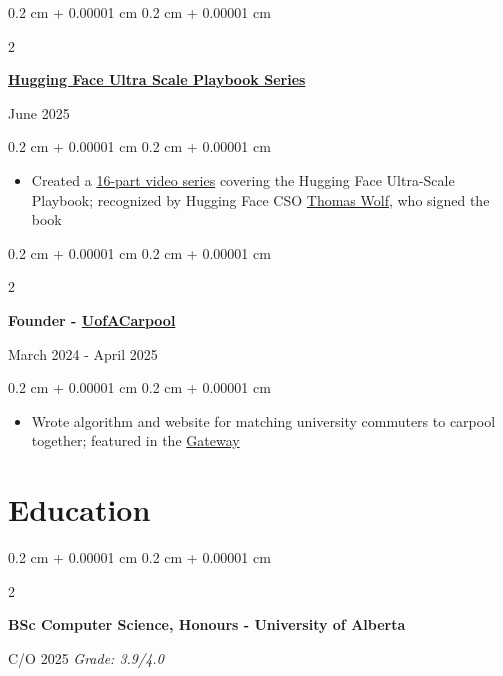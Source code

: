 \documentclass[10pt, letterpaper]{article}
\newenvironment{highlights}{
    \begin{itemize}[
        topsep=0.09 cm,
        parsep=0.09 cm,
        partopsep=0pt,
        itemsep=0pt,
        leftmargin=0.4 cm + 10pt
    ]
}{
    \end{itemize}
}
\newenvironment{onecolentry}{
    \begin{adjustwidth}{
        0.2 cm + 0.00001 cm
    }{
        0.2 cm + 0.00001 cm
    }
}{
    \end{adjustwidth}
}
\newenvironment{twocolentry}[2][]{
    \begin{adjustwidth}{
        0.2 cm + 0.00001 cm
    }{
        0.2 cm + 0.00001 cm
    }
    \def\secondColumn{#2}
    \setcolumnwidth{\fill, 5.2 cm}
    \begin{paracol}{2}
}{
    \switchcolumn \raggedleft \secondColumn
    \end{paracol}
    \end{adjustwidth}
}
\let\hrefWithoutArrow\href
\renewcommand{\href}[2]{\hrefWithoutArrow{#1}{#2}}
\begin{document}
        \vspace{0.09 cm}

        \begin{twocolentry}{June 2025}
            \textbf{\href{https://github.com/kiankyars/Ultra-Scale-Playbook-Series}{Hugging Face Ultra Scale Playbook Series}}
        \end{twocolentry}

        \vspace{0.09 cm}
        \begin{onecolentry}
            \begin{highlights}
                \item Created a \href{https://youtube.com/playlist?list=PLWVevi-n5pPy-Y9swxvs5AiTwA_QzUXsr\&si=TpY9vB9jMqNBk3aZ}{16-part video series} covering the Hugging Face Ultra-Scale Playbook; recognized by Hugging Face CSO \href{https://kiankyars.github.io/imgs/2025-08-29-weekly-victories/uspb.jpg}{Thomas Wolf}, who signed the book
            \end{highlights}
        \end{onecolentry}

        \vspace{0.09 cm}

        \begin{twocolentry}{March 2024 - April 2025}
            \textbf{Founder - \href{https://kiankyars.github.io/uofacarpool/}{UofACarpool}}
        \end{twocolentry}

        \vspace{0.09 cm}
        \begin{onecolentry}
            \begin{highlights}
                \item Wrote algorithm and website for matching university commuters to carpool together; featured in the \href{https://thegatewayonline.ca/2024/10/u-of-a-carpool-aims-to-make-campus-more-eco-friendly/}{Gateway}
            \end{highlights}
        \end{onecolentry}

        \vspace{0.09 cm}

    \section{Education}
        \begin{twocolentry}{C/O 2025 \textit{Grade: 3.9/4.0}}
            \textbf{BSc Computer Science, Honours - University of Alberta}
        \end{twocolentry}
\end{document}
